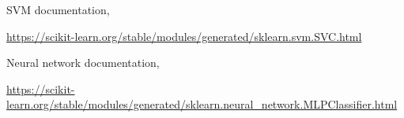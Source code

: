 \documentclass[a4paper ,12pt]{article}
\begin{document}
\begin{thebibliography}{99}
	\bibitem{} SVM documentation,
	
	\url{
		https://scikit-learn.org/stable/modules/generated/sklearn.svm.SVC.html}
	
	\bibitem{} Neural network documentation,
	
	\url{
		https://scikit-learn.org/stable/modules/generated/sklearn.neural\_network.MLPClassifier.html}
	
	
	
	







	

	
\end{thebibliography}
\end{document}
